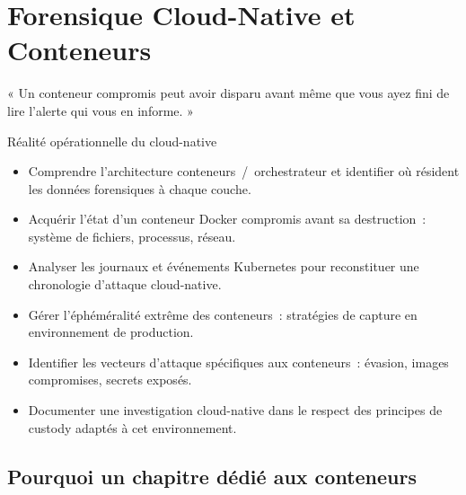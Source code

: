 
\chapter{Forensique Cloud-Native et Conteneurs}
\label{chap:containers}

\epigraph{%
    « Un conteneur compromis peut avoir disparu avant même que vous
    ayez fini de lire l'alerte qui vous en informe. »%
}{Réalité opérationnelle du cloud-native}


\begin{boxobjectifs}
\begin{itemize}
    \item Comprendre l'architecture conteneurs~/~orchestrateur et
          identifier où résident les données forensiques à chaque couche.
    \item Acquérir l'état d'un conteneur Docker compromis avant
          sa destruction~: système de fichiers, processus, réseau.
    \item Analyser les journaux et événements Kubernetes pour
          reconstituer une chronologie d'attaque cloud-native.
    \item Gérer l'éphéméralité extrême des conteneurs~: stratégies
          de capture en environnement de production.
    \item Identifier les vecteurs d'attaque spécifiques aux
          conteneurs~: évasion, images compromises, secrets exposés.
    \item Documenter une investigation cloud-native dans le respect
          des principes de custody adaptés à cet environnement.
\end{itemize}
\end{boxobjectifs}

\bigskip

\section*{Pourquoi un chapitre dédié aux conteneurs}

